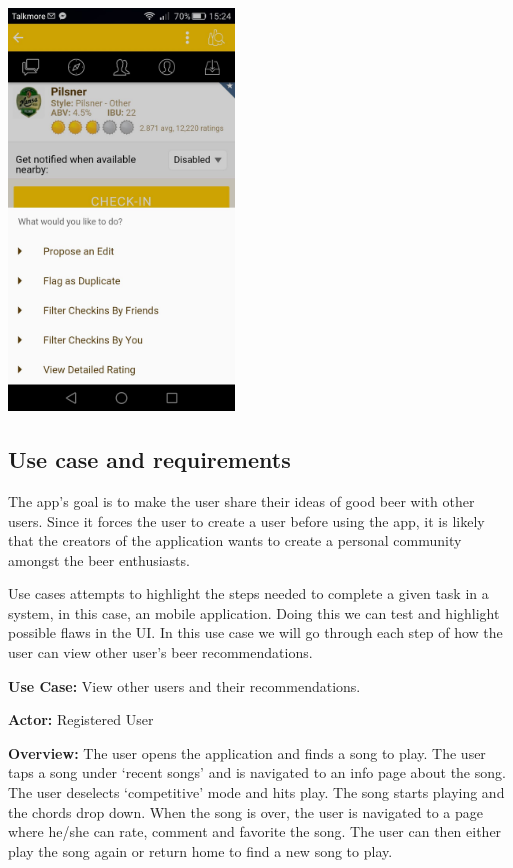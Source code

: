 \documentclass[12pt]{article}
\begin{document}
\includegraphics[width=6cm]{pictures/app/help}

\subsection{Use case and requirements}
The app’s goal is to make the user share their ideas of good beer with other
users. Since it forces the user to create a user before using the app, it is
likely that the creators of the application wants to create a personal community amongst
the beer enthusiasts. 


Use cases attempts to highlight the steps needed to complete a given task in a
system, in this case, an mobile application.\cite{usecase} Doing this we can test and highlight
possible flaws in the UI. In this use case we will go through each step of how
the user can view other user's beer recommendations.

\textbf{Use Case:} View other users and their recommendations. 

\textbf{Actor:} Registered User

\textbf{Overview:} The user opens the application and finds a song to play. The user
taps a song under ‘recent songs’ and is navigated to an info page about the
song. The user deselects ‘competitive’ mode and hits play. The song starts
playing and the chords drop down. When the song is over, the user is navigated
to a page where he/she can rate, comment and favorite the song. The user can
then either play the song again or return home to find a new song to play.
\end{document}
